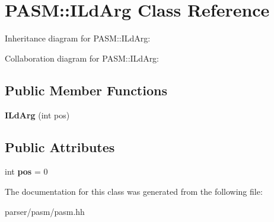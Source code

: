 \hypertarget{classPASM_1_1ILdArg}{}\section{P\+A\+SM\+:\+:I\+Ld\+Arg Class Reference}
\label{classPASM_1_1ILdArg}


Inheritance diagram for P\+A\+SM\+:\+:I\+Ld\+Arg\+:


Collaboration diagram for P\+A\+SM\+:\+:I\+Ld\+Arg\+:
\subsection*{Public Member Functions}
\begin{DoxyCompactItemize}
\item 
\mbox{\label{classPASM_1_1ILdArg_aeecb30c0431a49ee6315930f5965816e}} 
{\bfseries I\+Ld\+Arg} (int pos)
\end{DoxyCompactItemize}
\subsection*{Public Attributes}
\begin{DoxyCompactItemize}
\item 
\mbox{\label{classPASM_1_1ILdArg_a94b94d960c0b252861ccfeb90c3bca45}} 
int {\bfseries pos} = 0
\end{DoxyCompactItemize}


The documentation for this class was generated from the following file\+:\begin{DoxyCompactItemize}
\item 
parser/pasm/pasm.\+hh\end{DoxyCompactItemize}
